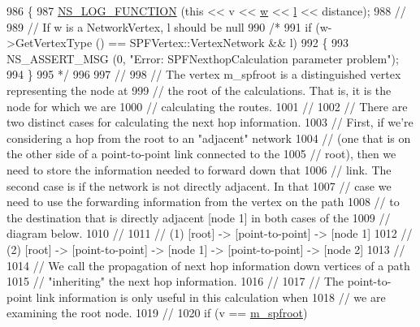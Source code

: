 \begin{DoxyCode}
986 \{
987   \hyperlink{log-macros-disabled_8h_a90b90d5bad1f39cb1b64923ea94c0761}{NS\_LOG\_FUNCTION} (\textcolor{keyword}{this} << v << \hyperlink{lte_2model_2fading-traces_2fading__trace__generator_8m_afd61ec66f9d7b807eece6eb12c781844}{w} << \hyperlink{buildings__pathloss_8m_a5b54c0a045f179bcbbbc9abcb8b5cd4c}{l} << distance);
988 \textcolor{comment}{//}
989 \textcolor{comment}{// If w is a NetworkVertex, l should be null}
990 \textcolor{comment}{/*}
991 \textcolor{comment}{  if (w->GetVertexType () == SPFVertex::VertexNetwork && l)}
992 \textcolor{comment}{    \{}
993 \textcolor{comment}{        NS\_ASSERT\_MSG (0, "Error:  SPFNexthopCalculation parameter problem");}
994 \textcolor{comment}{    \}}
995 \textcolor{comment}{*/}
996 
997 \textcolor{comment}{//}
998 \textcolor{comment}{// The vertex m\_spfroot is a distinguished vertex representing the node at}
999 \textcolor{comment}{// the root of the calculations.  That is, it is the node for which we are}
1000 \textcolor{comment}{// calculating the routes.}
1001 \textcolor{comment}{//}
1002 \textcolor{comment}{// There are two distinct cases for calculating the next hop information.}
1003 \textcolor{comment}{// First, if we're considering a hop from the root to an "adjacent" network}
1004 \textcolor{comment}{// (one that is on the other side of a point-to-point link connected to the}
1005 \textcolor{comment}{// root), then we need to store the information needed to forward down that}
1006 \textcolor{comment}{// link.  The second case is if the network is not directly adjacent.  In that}
1007 \textcolor{comment}{// case we need to use the forwarding information from the vertex on the path}
1008 \textcolor{comment}{// to the destination that is directly adjacent [node 1] in both cases of the}
1009 \textcolor{comment}{// diagram below.}
1010 \textcolor{comment}{// }
1011 \textcolor{comment}{// (1) [root] -> [point-to-point] -> [node 1]}
1012 \textcolor{comment}{// (2) [root] -> [point-to-point] -> [node 1] -> [point-to-point] -> [node 2]}
1013 \textcolor{comment}{//}
1014 \textcolor{comment}{// We call the propagation of next hop information down vertices of a path}
1015 \textcolor{comment}{// "inheriting" the next hop information.}
1016 \textcolor{comment}{//}
1017 \textcolor{comment}{// The point-to-point link information is only useful in this calculation when}
1018 \textcolor{comment}{// we are examining the root node. }
1019 \textcolor{comment}{//}
1020   \textcolor{keywordflow}{if} (v == \hyperlink{classns3_1_1GlobalRouteManagerImpl_a977f6b62ef1f1b58d041a2f49c093a1c}{m\_spfroot})

\end{DoxyCode}
